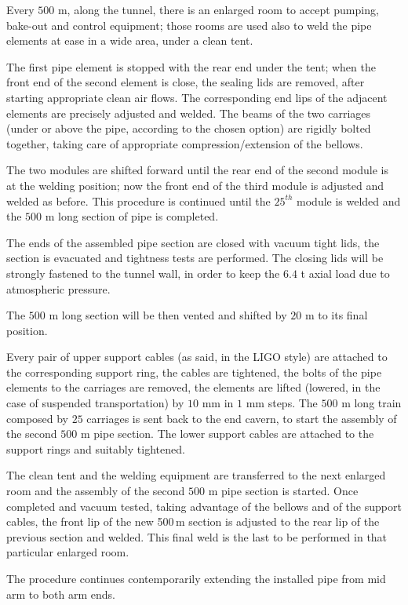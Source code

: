 Every $500$ m, along the tunnel, there is an enlarged room to accept pumping, bake-out and control equipment; those rooms are used also to weld the pipe elements at ease in a wide area, under a clean tent.

The first pipe element is stopped with the rear end under the tent; when the front end of the second element is close, the sealing lids are removed, after starting appropriate clean air flows. The corresponding end lips of the adjacent elements are precisely adjusted and welded. The beams of the two carriages (under or above the pipe, according to the chosen option) are rigidly bolted together, taking care of appropriate compression/extension of the bellows.

The two modules are shifted forward until the rear end of the second module is at the welding position; now the front end of the third module is adjusted and welded as before. This procedure is continued until the $25^{th}$ module is welded and the $500$ m long section of pipe is completed.

The ends of the assembled pipe section are closed with vacuum tight lids, the section is evacuated and tightness tests are performed. The closing lids will be strongly fastened to the tunnel wall, in order to keep the $6.4$ t axial load due to atmospheric pressure.

The $500$ m long section will be then vented and shifted by $20$ m to its final position.

Every pair of upper support cables (as said, in the LIGO style) are attached to the corresponding support ring, the cables are tightened, the bolts of the pipe elements to the carriages are removed, the elements are lifted (lowered, in the case of suspended transportation) by $10$ mm in $1$ mm steps. The $500$ m long train composed by $25$ carriages is sent back to the end cavern, to start the assembly of the second $500$ m pipe section. The lower support cables are attached to the support rings and suitably tightened.

The clean tent and the welding equipment are transferred to the next enlarged room and the assembly of the second $500$ m pipe section is started. Once completed and vacuum tested, taking advantage of the bellows and of the support cables, the front lip of the new 500\,m section is adjusted to the rear lip of the previous section and welded. This final weld is the last to be performed in that particular enlarged room.

The procedure continues contemporarily extending the installed pipe from mid arm to both arm ends.

